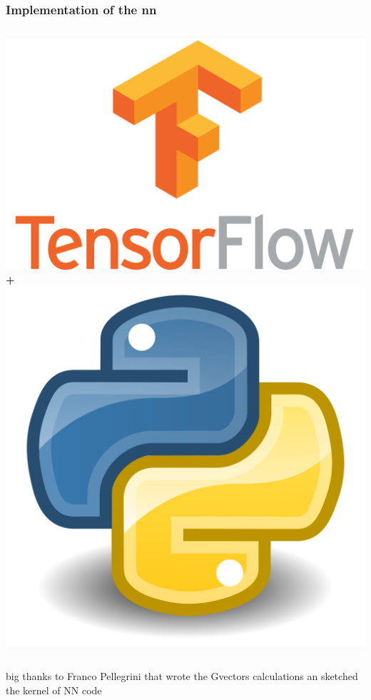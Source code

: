 \documentclass[12pt,notes=off,unicode]{beamer}
\begin{document}
    \begin{frame}[c]\frametitle{Implementation of the nn}

      \begin{columns}
          \includegraphics[width=\textwidth]{img/TF_logo.png}
            \textbf{+}
          \includegraphics[width=\textwidth]{img/py_logo.png}
      \end{columns}

      \par\hfill \tiny big thanks to Franco Pellegrini that wrote the Gvectors calculations an sketched the kernel of NN code

    \end{frame}
\end{document}

